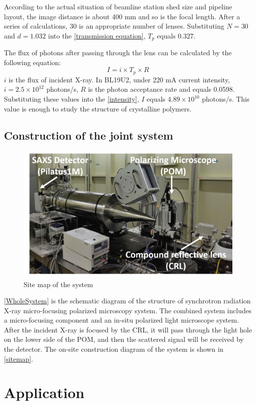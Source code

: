 \documentclass{Head}
\begin{document}
According to the actual situation of beamline station shed size and pipeline layout, the image distance is about 400 mm and so is the focal length.
After a series of calculations, 30 is an appropriate number of lenses.
Substituting $N=30$ and $d=1.032$ into the \autoref{transmission equation}, $T_p$ equals 0.327.


The flux of photons after passing through the lens can be calculated by the following equation:
\begin{equation}
  I=i\times T_p \times R
  \label{intensity}
\end{equation}
$i$ is the flux of incident X-ray.
In BL19U2, under 220 mA current intensity, $i=2.5\times 10^{12}$ photons/s, $R$ is the photon acceptance rate and equals 0.0598.
Substituting these values into the \autoref{intensity}, $I$ equals $4.89\times 10^{10}$ photons/s. This value is enough to study the structure of crystalline polymers.
\subsection{Construction of the joint system}
\begin{figure}
  \centering
  \includegraphics[scale=0.5]{Figures/Fig4SiteMap.png}
  \caption{Site map of the system}
  \label{sitemap}
\end{figure}
\autoref{WholeSystem} is the schematic diagram of the structure of synchrotron radiation X-ray micro-focusing polarized microscopy system.
The combined system includes a micro-focusing component and an in-situ polarized light microscope system.
After the incident X-ray is focused by the CRL, it will pass through the light hole on the lower side of the POM, and then the scattered signal will be received by the detector.
The on-site construction diagram of the system is shown in \autoref{sitemap}.
\section{Application}
\end{document}
